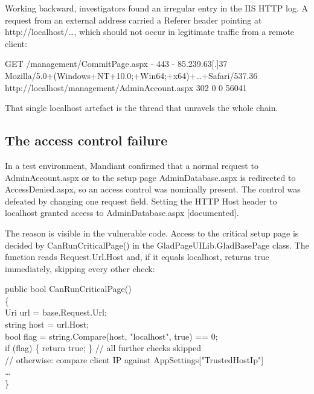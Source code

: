 \documentclass[11pt,a4paper]{article}
\newcommand{\code}[1]{{\small\ttfamily #1}}
\newenvironment{codeblock}
  {\par\needspace{3\baselineskip}\vspace{3pt}\begin{lrbox}{\cbbox}\begin{minipage}{\dimexpr\linewidth-1.6em}\footnotesize\ttfamily\raggedright\vspace{3pt}}
  {\vspace{3pt}\end{minipage}\end{lrbox}\noindent\hspace*{0.4em}\colorbox{codebg}{\usebox{\cbbox}}\par\vspace{3pt}}
\newcommand{\tier}[1]{{\small\color{meta}\textsf{[#1]}}}
\begin{document}
Working backward, investigators found an irregular entry in the IIS HTTP log. A request from an external address carried a \code{Referer} header pointing at \code{http://localhost/\ldots}, which should not occur in legitimate traffic from a remote client:

\begin{codeblock}
GET /management/CommitPage.aspx - 443 - 85.239.63[.]37\\
Mozilla/5.0+(Windows+NT+10.0;+Win64;+x64)+\ldots+Safari/537.36\\
http://localhost/management/AdminAccount.aspx 302 0 0 56041
\end{codeblock}

That single \code{localhost} artefact is the thread that unravels the whole chain.

\subsection{The access control failure}

In a test environment, Mandiant confirmed that a normal request to \code{AdminAccount.aspx} or to the setup page \code{AdminDatabase.aspx} is redirected to \code{AccessDenied.aspx}, so an access control was nominally present. The control was defeated by changing one request field. Setting the HTTP \code{Host} header to \code{localhost} granted access to \code{AdminDatabase.aspx} \tier{documented}.

The reason is visible in the vulnerable code. Access to the critical setup page is decided by \code{CanRunCriticalPage()} in the \code{GladPageUILib.GladBasePage} class. The function reads \code{Request.Url.Host} and, if it equals \code{localhost}, returns \code{true} immediately, skipping every other check:

\begin{codeblock}
public bool CanRunCriticalPage()\\
\{\\
\hspace*{1em}Uri url = base.Request.Url;\\
\hspace*{1em}string host = url.Host;\\
\hspace*{1em}bool flag = string.Compare(host, "localhost", true) == 0;\\
\hspace*{1em}if (flag) \{ return true; \}   // all further checks skipped\\
\hspace*{1em}// otherwise: compare client IP against AppSettings["TrustedHostIp"]\\
\hspace*{1em}\ldots\\
\}
\end{codeblock}
\end{document}
